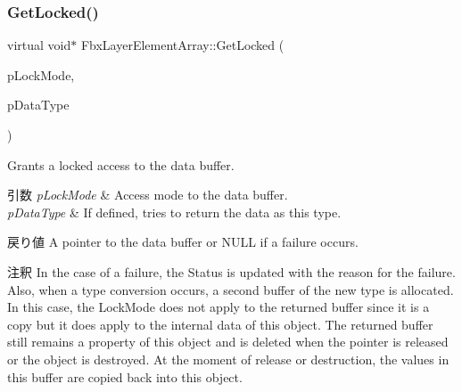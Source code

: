 \subsubsection{\texorpdfstring{Get\+Locked()}{GetLocked()}\hspace{0.1cm}{\footnotesize\ttfamily [1/3]}}
{\footnotesize\ttfamily virtual void$\ast$ Fbx\+Layer\+Element\+Array\+::\+Get\+Locked (\begin{DoxyParamCaption}\item[{\hyperlink{class_fbx_layer_element_array_a8968b1fb337f924d0e9ca87302b54d70}{E\+Lock\+Mode}}]{p\+Lock\+Mode,  }\item[{\hyperlink{fbxpropertytypes_8h_a73913a5ddfb20e57c6f25e9e6784bd92}{E\+Fbx\+Type}}]{p\+Data\+Type }\end{DoxyParamCaption})\hspace{0.3cm}{\ttfamily [virtual]}}

Grants a locked access to the data buffer. 
\begin{DoxyParams}{引数}
{\em p\+Lock\+Mode} & Access mode to the data buffer. \\
\hline
{\em p\+Data\+Type} & If defined, tries to return the data as this type. \\
\hline
\end{DoxyParams}
\begin{DoxyReturn}{戻り値}
A pointer to the data buffer or N\+U\+LL if a failure occurs. 
\end{DoxyReturn}
\begin{DoxyRemark}{注釈}
In the case of a failure, the Status is updated with the reason for the failure. Also, when a type conversion occurs, a second buffer of the new type is allocated. In this case, the Lock\+Mode does not apply to the returned buffer since it is a copy but it does apply to the internal data of this object. The returned buffer still remains a property of this object and is deleted when the pointer is released or the object is destroyed. At the moment of release or destruction, the values in this buffer are copied back into this object. 
\end{DoxyRemark}
\mbox{\label{class_fbx_layer_element_array_abd1fe9d5f32d6b07aa451e698a666819}} 
